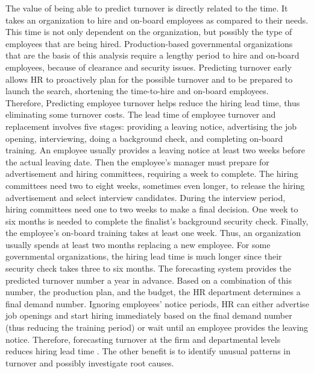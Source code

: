The value of being able to predict turnover is directly related to the time. It takes an organization to hire and on-board employees as compared to their needs. This time is not only dependent on the organization, but possibly the type of employees that are being hired. Production-based governmental organizations that are the basis of this analysis require a lengthy period to hire and on-board employees, because of clearance and security issues. Predicting turnover early allows HR to proactively plan for the possible turnover and to be prepared to launch the search, shortening the time-to-hire and on-board employees. Therefore, Predicting employee turnover helps reduce the hiring lead time, thus eliminating some turnover costs. The lead time of employee turnover and replacement involves five stages: providing a leaving notice, advertising the job opening, interviewing, doing a background check, and completing on-board training. An employee usually provides a leaving notice at least two weeks before the actual leaving date. Then the employee's manager must prepare for advertisement and hiring committees, requiring a week to complete.  The hiring committees need two to eight weeks, sometimes even longer, to release the hiring advertisement and select interview candidates. During the interview period, hiring committees need one to two weeks to make a final decision. One week to six months is needed to complete the finalist's background security check. Finally, the employee's on-board training takes at least one week. Thus, an organization usually spends at least two months replacing a new employee. For some governmental organizations, the hiring lead time is much longer since their security check takes three to six months. The forecasting system provides the predicted turnover number a year in advance. Based on a combination of this number, the production plan, and the budget, the HR department determines a final demand number. Ignoring employees' notice periods, HR can either advertise job openings and start hiring immediately based on the final demand number (thus reducing the training period) or wait until an employee provides the leaving notice.  Therefore, forecasting turnover at the firm and departmental levels reduces hiring lead time \citep{kacmar2006}. The other benefit is to identify unusual patterns in turnover and possibly investigate root causes. 

